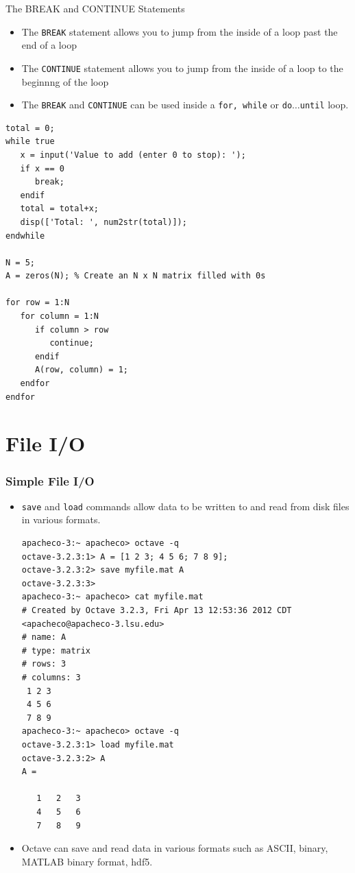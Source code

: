 \documentclass[t,compress,xcolor=svgnames]{beamer}
\newenvironment{eblock}[0]
{
\begin{beamerboxesrounded}[upper=uppercol2,lower=lowercol2,shadow=true]}
{\end{beamerboxesrounded}}
\begin{document}
\begin{frame}
  \begin{eblock}{The BREAK and CONTINUE Statements}
    \begin{itemize}
      \item[] The \texttt{BREAK} statement allows you to jump from the inside of a loop past the end of a loop
      \item[] The \texttt{CONTINUE} statement allows you to jump from the inside of a loop to the beginnng of the loop
      \item[] The \texttt{BREAK} and \texttt{CONTINUE} can be used inside a \texttt{for, while} or \texttt{do$\dots$until} loop.
    \end{itemize}
    {\tiny
        \begin{verbatim}
total = 0;
while true
   x = input('Value to add (enter 0 to stop): ');
   if x == 0
      break;
   endif
   total = total+x;
   disp(['Total: ', num2str(total)]);
endwhile

N = 5;
A = zeros(N); % Create an N x N matrix filled with 0s

for row = 1:N
   for column = 1:N
      if column > row
         continue;
      endif
      A(row, column) = 1;
   endfor
endfor
        \end{verbatim}
    }
  \end{eblock}
\end{frame}

\section{File I/O}
\begin{frame}
  \frametitle{\small Simple File I/O}
  \begin{itemize}
    \item \texttt{save} and \texttt{load} commands allow data to be written to and read from disk files in various formats.
    {\tiny
      \begin{verbatim}
apacheco-3:~ apacheco> octave -q
octave-3.2.3:1> A = [1 2 3; 4 5 6; 7 8 9];
octave-3.2.3:2> save myfile.mat A
octave-3.2.3:3> 
apacheco-3:~ apacheco> cat myfile.mat 
# Created by Octave 3.2.3, Fri Apr 13 12:53:36 2012 CDT <apacheco@apacheco-3.lsu.edu>
# name: A
# type: matrix
# rows: 3
# columns: 3
 1 2 3
 4 5 6
 7 8 9
apacheco-3:~ apacheco> octave -q
octave-3.2.3:1> load myfile.mat
octave-3.2.3:2> A
A =

   1   2   3
   4   5   6
   7   8   9
      \end{verbatim}
    }
    \item Octave can save and read data in various formats such as ASCII, binary, MATLAB binary format, hdf5.
  \end{itemize}
\end{frame}
\end{document}

